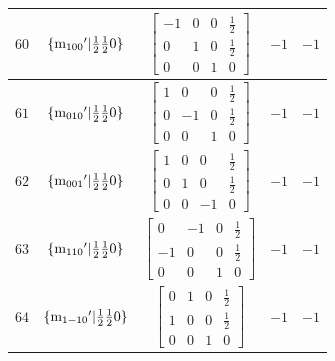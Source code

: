 \documentclass[fleqn,8pt]{jsarticle}
\begin{document}
\begin{longtable}{ccccc}
$ 60 $ & $ \{{\rm m}_{100}{}'|\frac{1}{2} \frac{1}{2} 0\} $ & $ \begin{bmatrix} -1 & 0 & 0 & \frac{1}{2} \\ 0 & 1 & 0 & \frac{1}{2} \\ 0 & 0 & 1 & 0 \end{bmatrix} $ & $ -1 $ & $ -1 $ \\ \hline
$ 61 $ & $ \{{\rm m}_{010}{}'|\frac{1}{2} \frac{1}{2} 0\} $ & $ \begin{bmatrix} 1 & 0 & 0 & \frac{1}{2} \\ 0 & -1 & 0 & \frac{1}{2} \\ 0 & 0 & 1 & 0 \end{bmatrix} $ & $ -1 $ & $ -1 $ \\ \hline
$ 62 $ & $ \{{\rm m}_{001}{}'|\frac{1}{2} \frac{1}{2} 0\} $ & $ \begin{bmatrix} 1 & 0 & 0 & \frac{1}{2} \\ 0 & 1 & 0 & \frac{1}{2} \\ 0 & 0 & -1 & 0 \end{bmatrix} $ & $ -1 $ & $ -1 $ \\ \hline
$ 63 $ & $ \{{\rm m}_{110}{}'|\frac{1}{2} \frac{1}{2} 0\} $ & $ \begin{bmatrix} 0 & -1 & 0 & \frac{1}{2} \\ -1 & 0 & 0 & \frac{1}{2} \\ 0 & 0 & 1 & 0 \end{bmatrix} $ & $ -1 $ & $ -1 $ \\ \hline
$ 64 $ & $ \{{\rm m}_{1-10}{}'|\frac{1}{2} \frac{1}{2} 0\} $ & $ \begin{bmatrix} 0 & 1 & 0 & \frac{1}{2} \\ 1 & 0 & 0 & \frac{1}{2} \\ 0 & 0 & 1 & 0 \end{bmatrix} $ & $ -1 $ & $ -1 $ \\
\end{longtable}
\end{document}

